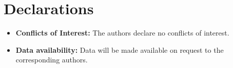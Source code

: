 \documentclass[a4paper,fleqn]{cas-sc}
\begin{document}
\section*{Declarations}
\begin{itemize}
\item \textbf{Conflicts of Interest:}  The authors declare no conflicts of interest.

\item \textbf{Data availability:} Data will be made available on request to the corresponding
authors.
\end{itemize}
\printcredits

\newpage

\nocite{*}


\vspace{12pt}
\end{document}
